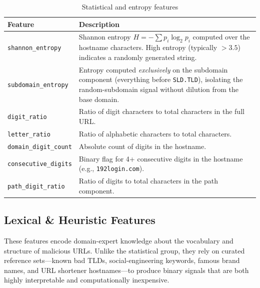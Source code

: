 \documentclass[12pt,a4paper]{article}
\begin{document}
\begin{table}[H]
    \centering
    \begin{tabularx}{\textwidth}{l >{\raggedright\arraybackslash}X}
        \toprule
        \textbf{Feature} & \textbf{Description} \\
        \midrule
        \texttt{shannon\_entropy}    & Shannon entropy $H = -\sum p_i \log_2 p_i$ computed over the hostname characters. High entropy (typically $> 3.5$) indicates a randomly generated string. \\
        \addlinespace[4pt]
        \texttt{subdomain\_entropy}  & Entropy computed \textit{exclusively} on the subdomain component (everything before \texttt{SLD.TLD}), isolating the random-subdomain signal without dilution from the base domain. \\
        \addlinespace[4pt]
        \texttt{digit\_ratio}        & Ratio of digit characters to total characters in the full URL. \\
        \addlinespace[4pt]
        \texttt{letter\_ratio}       & Ratio of alphabetic characters to total characters. \\
        \addlinespace[4pt]
        \texttt{domain\_digit\_count}& Absolute count of digits in the hostname. \\
        \addlinespace[4pt]
        \texttt{consecutive\_digits} & Binary flag for 4+ consecutive digits in the hostname (e.g., \texttt{192login.com}). \\
        \addlinespace[4pt]
        \texttt{path\_digit\_ratio}  & Ratio of digits to total characters in the path component. \\
        \bottomrule
    \end{tabularx}
    \caption{Statistical and entropy features}
    \label{tab:feat_entropy}
\end{table}

\subsection{Lexical \& Heuristic Features}

These features encode domain-expert knowledge about the vocabulary and structure of malicious URLs. Unlike the statistical group, they rely on curated reference sets---known bad TLDs, social-engineering keywords, famous brand names, and URL shortener hostnames---to produce binary signals that are both highly interpretable and computationally inexpensive.
\end{document}
